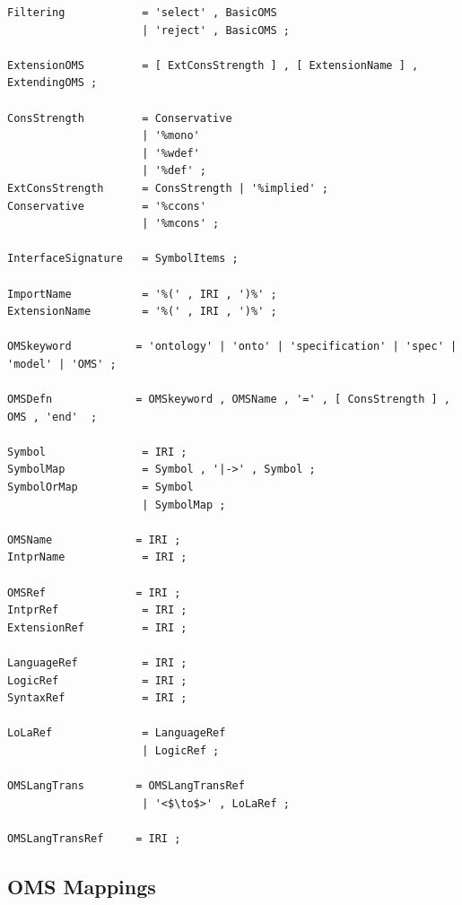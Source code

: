\documentclass[10pt,%
\ifpretendfinal
final%
\else
draft%
\fi,
]{scrreprt}
\newcommand{\ssclause}[1]{\subsection{#1}}
\begin{document}
\begin{lstlisting}[language=ebnf,escapeinside={<>},mathescape]
Filtering            = 'select' , BasicOMS 
                     | 'reject' , BasicOMS ;

ExtensionOMS         = [ ExtConsStrength ] , [ ExtensionName ] , ExtendingOMS ;

ConsStrength         = Conservative
                     | '%mono'
                     | '%wdef'
                     | '%def' ;
ExtConsStrength      = ConsStrength | '%implied' ;
Conservative         = '%ccons'
                     | '%mcons' ; 

InterfaceSignature   = SymbolItems ;

ImportName           = '%(' , IRI , ')%' ;
ExtensionName        = '%(' , IRI , ')%' ;

OMSkeyword          = 'ontology' | 'onto' | 'specification' | 'spec' | 'model' | 'OMS' ;

OMSDefn             = OMSkeyword , OMSName , '=' , [ ConsStrength ] , OMS , 'end'  ; 

Symbol               = IRI ;
SymbolMap            = Symbol , '|->' , Symbol ;
SymbolOrMap          = Symbol
                     | SymbolMap ;

OMSName             = IRI ;
IntprName            = IRI ;

OMSRef              = IRI ;
IntprRef             = IRI ;
ExtensionRef         = IRI ;

LanguageRef          = IRI ;
LogicRef             = IRI ;
SyntaxRef            = IRI ;

LoLaRef              = LanguageRef
                     | LogicRef ;

OMSLangTrans        = OMSLangTransRef
                     | '<$\to$>' , LoLaRef ;

OMSLangTransRef     = IRI ;
\end{lstlisting}


\ssclause{OMS Mappings}
\end{document}
